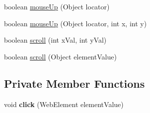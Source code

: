 \begin{DoxyCompactItemize}
\item 
boolean \hyperlink{classcom_1_1zeuslearning_1_1automation_1_1selenium_1_1interactions_1_1Mouse_a0b7f2ca5dafa810dc0a0ec1669f40fef}{mouse\+Up} (Object locator)
\item 
boolean \hyperlink{classcom_1_1zeuslearning_1_1automation_1_1selenium_1_1interactions_1_1Mouse_a698245231ac2a9ab0080d6390e8a4b95}{mouse\+Up} (Object locator, int x, int y)
\item 
boolean \hyperlink{classcom_1_1zeuslearning_1_1automation_1_1selenium_1_1interactions_1_1Mouse_a6ff0b8676b191327548fc56b852c2a65}{scroll} (int x\+Val, int y\+Val)
\item 
boolean \hyperlink{classcom_1_1zeuslearning_1_1automation_1_1selenium_1_1interactions_1_1Mouse_a64c168b0d5f3a2df84426d3723960a97}{scroll} (Object element\+Value)
\end{DoxyCompactItemize}
\subsection*{Private Member Functions}
\begin{DoxyCompactItemize}
\item 
\hypertarget{classcom_1_1zeuslearning_1_1automation_1_1selenium_1_1interactions_1_1Mouse_abd13d2447d614c9d9b2f1e9000e88df1}{}\label{classcom_1_1zeuslearning_1_1automation_1_1selenium_1_1interactions_1_1Mouse_abd13d2447d614c9d9b2f1e9000e88df1} 
void {\bfseries click} (Web\+Element element\+Value)
\end{DoxyCompactItemize}
